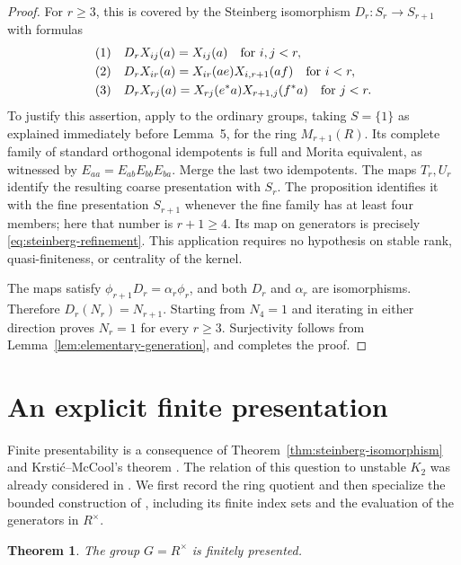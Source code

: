 \documentclass[11pt]{amsart}
\newtheorem{theorem}{Theorem}[section]
\theoremstyle{definition}
\theoremstyle{remark}
\numberwithin{equation}{section}
\newcommand{\eqrownum}[1][]{%
  \hbox{\refstepcounter{equation}%
    \if\relax\detokenize{#1}\relax\else\label{#1}\fi
    \normalfont(\theequation)}}
\begin{document}
\begin{proof}
For $r\geq3$, this is covered by the Steinberg isomorphism $D_r:S_r\to S_{r+1}$ with formulas
$$
\begin{aligned}
\eqrownum &\quad D_rX_{ij}(a)=X_{ij}(a) \quad \text{for }i,j<r,\\
\eqrownum &\quad D_rX_{ir}(a)=X_{ir}(ae)X_{i,r+1}(af) \quad \text{for }i<r,\\
\eqrownum[eq:steinberg-refinement] &\quad D_rX_{rj}(a)=X_{rj}(e^*a)X_{r+1,j}(f^*a) \quad \text{for }j<r.
\end{aligned}
$$
To justify this assertion, apply \cite[\S4, Proposition~1]{Voronetsky20} to the ordinary groups, taking $S=\{1\}$ as explained immediately before Lemma~5, for the ring $M_{r+1}(R)$. Its complete family of standard orthogonal idempotents is full and Morita equivalent, as witnessed by $E_{aa}=E_{ab}E_{bb}E_{ba}$. Merge the last two idempotents. The maps $T_r,U_r$ identify the resulting coarse presentation with $S_r$. The proposition identifies it with the fine presentation $S_{r+1}$ whenever the fine family has at least four members; here that number is $r+1\geq4$. Its map on generators is precisely \eqref{eq:steinberg-refinement}. This application requires no hypothesis on stable rank, quasi-finiteness, or centrality of the kernel.

The maps satisfy $\phi_{r+1}D_r=\alpha_r\phi_r$, and both $D_r$ and $\alpha_r$ are isomorphisms. Therefore $D_r(N_r)=N_{r+1}$. Starting from $N_4=1$ and iterating in either direction proves $N_r=1$ for every $r\geq3$. Surjectivity follows from Lemma~\ref{lem:elementary-generation}, and completes the proof.
\end{proof}

\section{An explicit finite presentation}
\label{sec:finite-presentation}

Finite presentability is a consequence of Theorem~\ref{thm:steinberg-isomorphism} and Krsti\'c--McCool's theorem \cite[Theorem~3]{KM99}. The relation of this question to unstable $K_2$ was already considered in \cite[\S8]{KT26}. We first record the ring quotient and then specialize the bounded construction of \cite[\S3]{KM99}, including its finite index sets and the evaluation of the generators in $R^\times$.

\begin{theorem}\label{thm:finite-presentation}
The group $G=R^\times$ is finitely presented.
\end{theorem}
\end{document}
